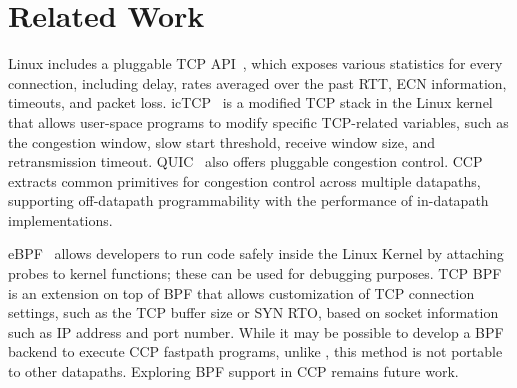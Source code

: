 \section{Related Work}
\label{s:relwork}
Linux includes a pluggable TCP API~\cite{lwn-pluggable-tcp}, which exposes various statistics for every connection, including delay, rates averaged over the past RTT, ECN information, timeouts, and packet loss.
icTCP~\cite{icTCP} is a modified TCP stack in the Linux kernel that allows user-space programs to modify specific TCP-related variables, such as the congestion window, slow start threshold, receive window size, and retransmission timeout. QUIC~\cite{quic} also offers pluggable congestion control. CCP extracts common primitives for congestion control across multiple datapaths, supporting off-datapath programmability with the performance of in-datapath implementations. 

eBPF~\cite{ebpf} allows developers to run code safely inside the Linux Kernel by attaching probes to kernel functions; these can be used for debugging purposes. TCP BPF~\cite{tcpbpf} is an extension on top of BPF that allows customization of TCP connection settings, such as the TCP buffer size or SYN RTO, based on socket information such as IP address and port number. While it may be possible to develop a BPF backend to execute CCP fastpath programs, unlike , this method is not portable to other datapaths. Exploring BPF support in CCP remains future work.
